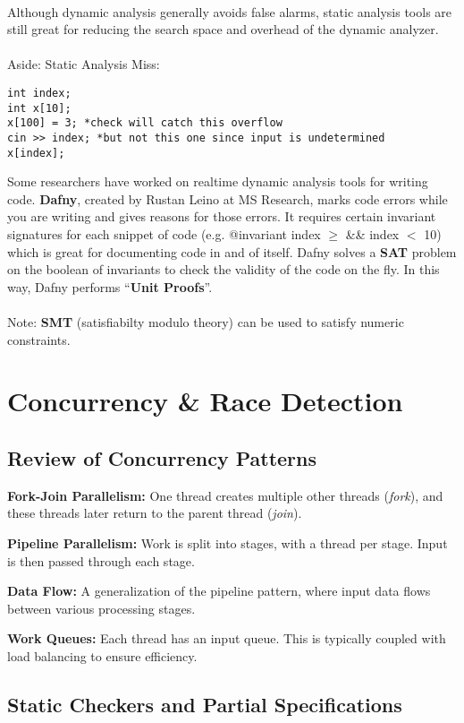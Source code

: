 \documentclass[twoside]{article}
\begin{document}
\\
Although dynamic analysis generally avoids false alarms, static analysis tools are still great for reducing the search space and overhead of the dynamic analyzer.\\
\\
Aside: Static Analysis Miss:
\begin{verbatim}
int index;
int x[10];
x[100] = 3; *check will catch this overflow
cin >> index; *but not this one since input is undetermined
x[index];
\end{verbatim}

Some researchers have worked on realtime dynamic analysis tools for writing code.  \textbf{Dafny}, created by Rustan Leino at MS Research, marks code errors while you are writing and gives reasons for those errors.  It requires certain invariant signatures for each snippet of code (e.g. @invariant index $\ge$ \&\& index $<$ 10) which is great for documenting code in and of itself.  Dafny solves a \textbf{SAT} problem on the boolean of invariants to check the validity of the code on the fly.  In this way, Dafny performs ``\textbf{Unit Proofs}''.\\
\\
Note: \textbf{SMT} (satisfiabilty modulo theory) can be used to satisfy numeric constraints.

\section{Concurrency \& Race Detection}

\subsection{Review of Concurrency Patterns}

\textbf{Fork-Join Parallelism:} One thread creates multiple other threads
(\emph{fork}), and these threads later return to the parent thread
(\emph{join}).

\textbf{Pipeline Parallelism:} Work is split into stages, with a thread per
stage. Input is then passed through each stage.

\textbf{Data Flow:} A generalization of the pipeline pattern, where input data
flows between various processing stages.

\textbf{Work Queues:} Each thread has an input queue. This is typically coupled
with load balancing to ensure efficiency.

\subsection{Static Checkers and Partial Specifications}
\end{document}
